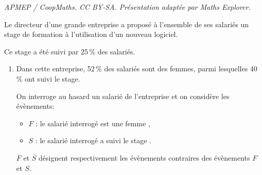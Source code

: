 \documentclass[10pt]{article}
\begin{document}
\noindent\textit{APMEP / CoopMaths. CC BY-SA. Présentation adaptée par Maths Explorer.}\par\medskip
\medskip

Le directeur d'une grande entreprise a proposé à l'ensemble de ses salariés un stage de formation à l'utilisation d'un nouveau logiciel.

Ce stage a été suivi par 25\,\% des salariés.

\medskip

\begin{enumerate}
\item Dans cette entreprise, 52\,\% des salariés sont des femmes, parmi lesquelles 
40\,\% ont suivi le stage.

On interroge au hasard un salarié de l'entreprise et on considère les évènements:

\setlength\parindent{1cm}
\begin{itemize}
\item[$\bullet~~$] $F$ : \og le salarié interrogé est une femme \fg,
\item[$\bullet~~$] $S$ : \og le salarié interrogé a suivi le stage \fg.
\end{itemize}
\setlength\parindent{0cm}

$\overline{F}$ et $\overline{S}$ désignent respectivement les évènements contraires des évènements $F$ et $S$.
\end{enumerate}
\end{document}
